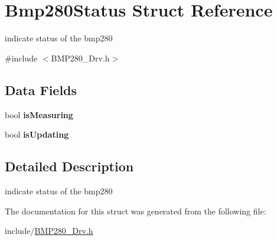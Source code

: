 \hypertarget{structBmp280Status}{}\section{Bmp280\+Status Struct Reference}
\label{structBmp280Status}


indicate status of the bmp280  




{\ttfamily \#include $<$B\+M\+P280\+\_\+\+Drv.\+h$>$}

\subsection*{Data Fields}
\begin{DoxyCompactItemize}
\item 
\mbox{\label{structBmp280Status_a93698ada8c3c1b98ddbae6478e7b84de}} 
bool {\bfseries is\+Measuring}
\item 
\mbox{\label{structBmp280Status_a9b045dcd90c16a01c754a9a64754ef24}} 
bool {\bfseries is\+Updating}
\end{DoxyCompactItemize}


\subsection{Detailed Description}
indicate status of the bmp280 

The documentation for this struct was generated from the following file\+:\begin{DoxyCompactItemize}
\item 
include/\hyperlink{BMP280__Drv_8h}{B\+M\+P280\+\_\+\+Drv.\+h}\end{DoxyCompactItemize}
